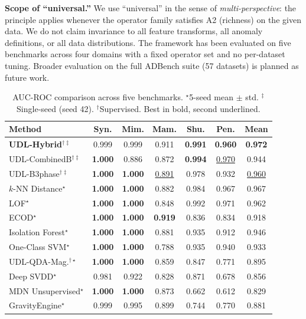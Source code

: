 \documentclass{article}
\begin{document}
\textbf{Scope of ``universal.''} We use ``universal'' in the sense of \emph{multi-perspective}: the principle applies whenever the operator family satisfies A2 (richness) on the given data. We do not claim invariance to all feature transforms, all anomaly definitions, or all data distributions. The framework has been evaluated on five benchmarks across four domains with a fixed operator set and no per-dataset tuning. Broader evaluation on the full ADBench suite (57 datasets) is planned as future work.


\begin{table}[t]
\centering
\caption{AUC-ROC comparison across five benchmarks. $^\star$5-seed mean $\pm$ std. $^\ddagger$Single-seed (seed 42). $^\dagger$Supervised. Best in bold, second underlined.}
\label{tab:main_results}
\begin{tabular}{@{}lcccccc@{}}
\toprule
\textbf{Method} & \textbf{Syn.} & \textbf{Mim.} & \textbf{Mam.} & \textbf{Shu.} & \textbf{Pen.} & \textbf{Mean} \\
\midrule
\textbf{UDL-Hybrid$^{\dagger\ddagger}$} & 0.999 & 0.999 & 0.911 & \textbf{0.991} & \textbf{0.960} & \textbf{0.972} \\
UDL-CombinedB$^{\dagger\ddagger}$ & \textbf{1.000} & 0.886 & 0.872 & \textbf{0.994} & \underline{0.970} & 0.944 \\
UDL-B3phase$^{\dagger\ddagger}$ & \textbf{1.000} & \textbf{1.000} & \underline{0.891} & 0.978 & 0.932 & \underline{0.960} \\
$k$-NN Distance$^\star$ & \textbf{1.000} & \textbf{1.000} & 0.882 & 0.984 & 0.967 & 0.967 \\
LOF$^\star$ & \textbf{1.000} & \textbf{1.000} & 0.848 & 0.992 & 0.971 & 0.962 \\
ECOD$^\star$ & \textbf{1.000} & \textbf{1.000} & \textbf{0.919} & 0.836 & 0.834 & 0.918 \\
Isolation Forest$^\star$ & \textbf{1.000} & \textbf{1.000} & 0.881 & 0.935 & 0.912 & 0.946 \\
One-Class SVM$^\star$ & \textbf{1.000} & \textbf{1.000} & 0.788 & 0.935 & 0.940 & 0.933 \\
UDL-QDA-Mag.$^{\dagger\star}$ & \textbf{1.000} & \textbf{1.000} & 0.859 & 0.847 & 0.771 & 0.895 \\
Deep SVDD$^\star$ & 0.981 & 0.922 & 0.828 & 0.871 & 0.678 & 0.856 \\
\midrule
MDN Unsupervised$^\star$ & \textbf{1.000} & \textbf{1.000} & 0.873 & 0.662 & 0.612 & 0.829 \\
GravityEngine$^\star$ & 0.999 & 0.995 & 0.899 & 0.744 & 0.770 & 0.881 \\
\bottomrule
\end{tabular}
\end{table}
\end{document}
